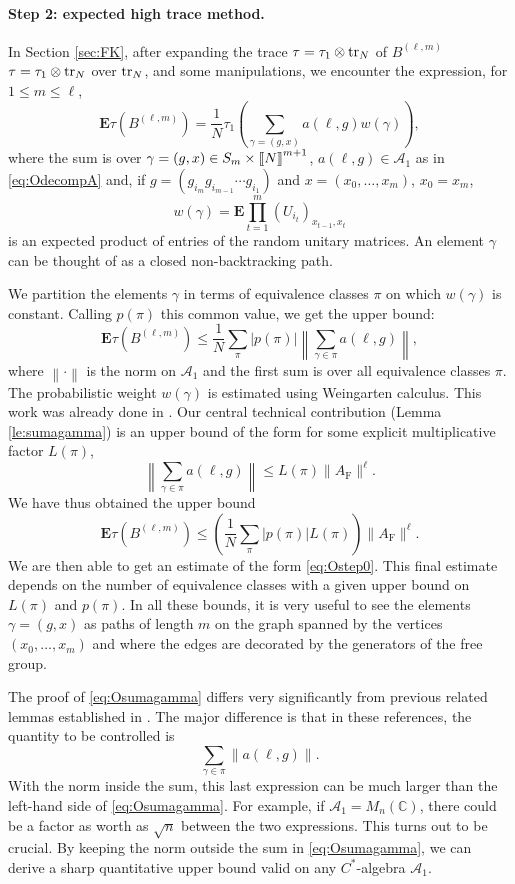 \documentclass[11pt]{article}
\renewcommand{\star}{{\mathrm{F}}}
\newcommand{\cA}{\mathcal{A}}
\newcommand{\tr}{{\rm tr}}
\newcommand{\dE}{\mathbf {E}}
\newcommand{\dC}{\mathbb {C}}
\newcommand{\NRM}[1]{{{\left\| #1\right\|}}} %
\newcommand{\PAR}[1]{{{\left(#1\right)}}} %
\newcommand{\1}{1\!\!{\sf I}}
\newcommand{\INT}[1]{{{\left[\hspace{-1.4pt}\left[#1\right]\hspace{-1.4pt}\right]}}}
\begin{document}
\paragraph{Step 2: expected high trace method. } 

In Section \ref{sec:FK}, after expanding the trace  $\tau = \tau_1 \otimes \tr_N$ of $B^{(\ell,m)}$  $\tau = \tau_1 \otimes \tr_N$ over $\tr_N$, and some manipulations, we encounter the expression, for $1 \leq m \leq \ell$,
$$
\dE \tau \PAR{  B^{(\ell,m)} } =   \frac 1 N  \tau_1 \PAR{ \sum_{\gamma = (g,x)} a(\ell,g) w(\gamma)  },
$$
where the sum is over $\gamma = (g,x) \in S_m \times \INT{N}^{m+1}$, $a(\ell,g) \in \cA_1$ as in \eqref{eq:OdecompA} and, if $g = (g_{i_m}g_{i_{m-1}} \cdots g_{i_1})$ and $x = (x_0,\ldots,x_m)$, $x_0 = x_m$,
$$w(\gamma ) = \dE \prod_{t=1}^{m} (U_{i_t})_{x_{t-1} , x_{t}}$$
is an expected product of entries of the random unitary matrices. An element $\gamma$ can be thought of as a closed non-backtracking path. 

We partition the elements $\gamma$ in terms of equivalence classes $\pi$ on which $w(\gamma)$ is constant.
Calling $p(\pi)$ this common value, we get the upper bound: 
$$
\dE \tau \PAR{  B^{(\ell,m)} } \leq  \frac 1 N  \sum_{\pi} |p(\pi)| \NRM{ \sum_{\gamma \in \pi} a(\ell,g)   },
$$
where $\NRM{\cdot}$ is the norm on $\cA_1$ and the first sum is over all equivalence classes $\pi$.
The probabilistic weight $w(\gamma)$ is estimated using Weingarten calculus. This work was already done in \cite{BC2}. Our central technical contribution (Lemma \ref{le:sumagamma}) is an upper bound of the form for some explicit multiplicative factor $L (\pi)$,
\begin{equation}\label{eq:Osumagamma}
\NRM{\sum_{\gamma \in \pi} a(\ell,g)} \leq L (\pi)\| A_\star \|^\ell.
\end{equation}
We have thus obtained the upper bound
$$
\dE \tau \PAR{  B^{(\ell,m)} } \leq \PAR{\frac 1 N  \sum_{\pi} |p(\pi)| L(\pi) } \| A_\star \|^\ell.
$$
We are then able to get an estimate of the form \eqref{eq:Ostep0}. This final estimate depends on the number of equivalence classes with a given upper bound on $L(\pi)$ and $p(\pi)$. In all these bounds, it is very useful to see the elements $\gamma = (g,x)$ as paths of length $m$ on the graph spanned by the vertices $(x_0,\ldots,x_m)$ and where the edges are decorated by the generators of the free group.


The proof of \eqref{eq:Osumagamma} differs very significantly from previous related lemmas established in \cite{MR4024563,BC2}. The major difference is that in these references, 
the quantity to be controlled is
$$
\sum_{\gamma \in \pi} \NRM{ a(\ell,g)}.
$$
With the norm inside the sum, this last expression can be much larger than the left-hand side of \eqref{eq:Osumagamma}. For example, if $\cA_1 = M_n(\dC)$, there could be a factor as worth as $\sqrt n$ between the two expressions. This turns out to be crucial. By keeping the norm outside the sum in \eqref{eq:Osumagamma}, we can derive a sharp quantitative upper bound valid on any $C^*$-algebra $\cA_1$.
\end{document}
